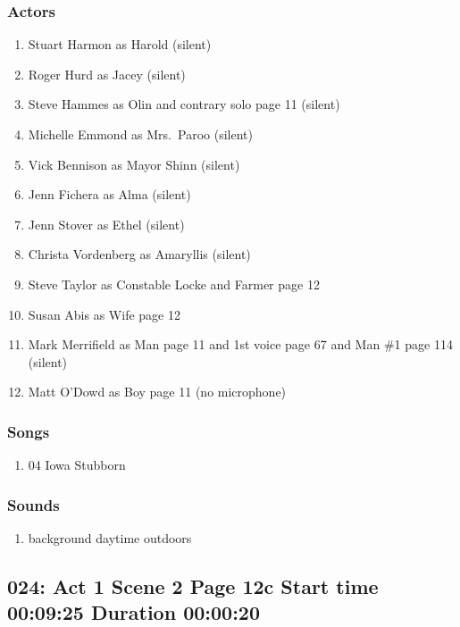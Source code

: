 \subsubsection{Actors}
\begin{enumerate}
\item Stuart Harmon as Harold (silent)
\item Roger Hurd as Jacey (silent)
\item Steve Hammes as Olin and contrary solo page 11 (silent)
\item Michelle Emmond as Mrs.~Paroo (silent)
\item Vick Bennison as Mayor Shinn (silent)
\item Jenn Fichera as Alma (silent)
\item Jenn Stover as Ethel (silent)
\item Christa Vordenberg as Amaryllis (silent)
\item Steve Taylor as Constable Locke and Farmer page 12
\item Susan Abis as Wife page 12
\item Mark Merrifield as Man page 11 and 1st voice page 67 and Man \#1 page 114 (silent)
\item Matt O'Dowd as Boy page 11 (no microphone)
\end{enumerate}

\subsubsection{Songs}
\begin{enumerate}
\item 04 Iowa Stubborn
\end{enumerate}\subsubsection{Sounds}
\begin{enumerate}
\item background daytime outdoors
\end{enumerate}
\subsection{024: Act 1 Scene 2 Page 12c Start time 00:09:25 Duration 00:00:20}

